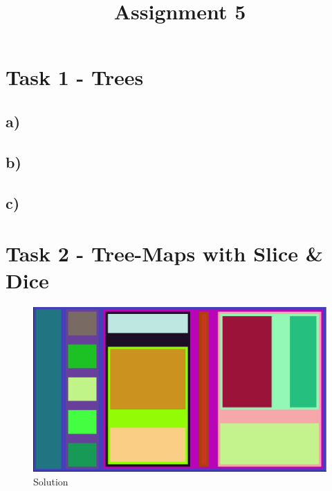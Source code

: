 \documentclass[a4paper]{article}
\date{}
\author{}
\title{\textbf{Assignment 5}}
\begin{document}
\maketitle 
\thispagestyle{fancy}

\section*{Task 1 - Trees}
\subsection*{a)}
\subsection*{b)}
\subsection*{c)}

\section*{Task 2 - Tree-Maps with Slice \& Dice}
\begin{figure}[!ht]
	\centering
	\includegraphics[width=0.9\linewidth]{5_2}
	\caption{Solution}
\end{figure}
\end{document}
